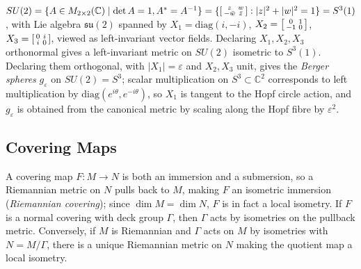 \begin{example}
  \label{ex:pet-ch1-su2-berger}
  \leanok
  $SU(2)=\{A\in M_{2\times2}(\mathbb{C})\mid\det A=1,A^*=A^{-1}\}
  =\{\begin{bsmallmatrix}z&w\\-\bar w&\bar z\end{bsmallmatrix}:|z|^2+|w|^2=1\}=S^3(1)$,
  with Lie algebra $\mathfrak{su}(2)$ spanned by
  $X_1=\mathrm{diag}(i,-i)$, $X_2=\begin{bsmallmatrix}0&1\\-1&0\end{bsmallmatrix}$,
  $X_3=\begin{bsmallmatrix}0&i\\i&0\end{bsmallmatrix}$, viewed as left-invariant
  vector fields. Declaring $X_1,X_2,X_3$ orthonormal gives a left-invariant
  metric on $SU(2)$ isometric to $S^3(1)$. Declaring them orthogonal, with
  $|X_1|=\varepsilon$ and $X_2,X_3$ unit, gives the \emph{Berger spheres}
  $g_\varepsilon$ on $SU(2)=S^3$; scalar multiplication on $S^3\subset\mathbb{C}^2$
  corresponds to left multiplication by $\mathrm{diag}(e^{i\theta},e^{-i\theta})$,
  so $X_1$ is tangent to the Hopf circle action, and $g_\varepsilon$ is obtained
  from the canonical metric by scaling along the Hopf fibre by $\varepsilon^2$.
\end{example}

\subsection{Covering Maps}

\begin{remark}
  \label{rem:pet-ch1-covering-metric}
  \leanok
  A covering map $F:M\to N$ is both an immersion and a submersion, so a
  Riemannian metric on $N$ pulls back to $M$, making $F$ an isometric immersion
  (\emph{Riemannian covering}); since $\dim M=\dim N$, $F$ is in fact a local
  isometry. If $F$ is a normal covering with deck group $\Gamma$, then $\Gamma$
  acts by isometries on the pullback metric. Conversely, if $M$ is Riemannian and
  $\Gamma$ acts on $M$ by isometries with $N=M/\Gamma$, there is a unique
  Riemannian metric on $N$ making the quotient map a local isometry.
\end{remark}

